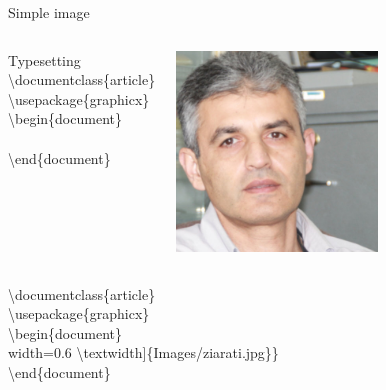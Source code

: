 \documentclass[10pt,xcolor={dvipsnames}]{beamer}
\begin{document}
		\begin{frame}{Simple image}
			\begin{columns}[T]
				
				\begin{column}{.6 \textwidth}
					\onslide<2->
					\begin{block}{Typesetting}
						\textbackslash documentclass\{{\color{blue}article}\}\\
						\textbackslash usepackage\{{\color{orange}graphicx}\}\\
						\textbackslash begin\{{\color{blue}document}\}\\
							\\
						\textbackslash end\{{\color{blue}document}\}\\
					\end{block}
				\end{column}
				
				\begin{column}{.4 \textwidth}
					\vspace{.5cm}
					\centering
					\includegraphics[width=0.6\textwidth]{Images/ziarati.jpg}
				\end{column}
			\end{columns}
		
			\begin{example}
				\textbackslash documentclass\{{\color{blue}article}\}\\
				\textbackslash usepackage\{{\color{orange}graphicx}\}\\
				\textbackslash begin\{{\color{blue}document}\}\\
					\quad{\color{orange}\textbackslash includegraphics\{[}width=0.6 \textbackslash textwidth{\color{orange}]\{}Images/ziarati.jpg{\color{orange}\}\}}\\
				\textbackslash end\{{\color{blue}document}\}\\
			\end{example}
		
		\end{frame}
	
\end{document}

